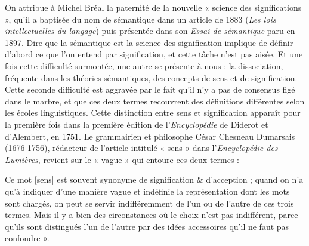 \begin{keybox}[Introduction]
\renewcommand{\thempfootnote}{校\arabic{editorialnote}}
On attribue à Michel Bréal la paternité de la nouvelle « science des significations », qu’il a baptisée du nom de sémantique dans un article de 1883 (\textit{Les lois intellectuelles du langage}) puis présentée dans son \textit{Essai de sémantique} paru en 1897. Dire que la sémantique est la science des signification implique de définir d’abord ce que l’on entend par signification, et cette tâche n’est pas aisée. Et une fois cette difficulté surmontée, une autre se présente à nous : la dissociation, fréquente dans les théories sémantiques, des concepts de sens et de signification. Cette seconde difficulté est aggravée par le fait qu’il n’y a pas de consensus figé dans le marbre, et que ces deux termes recouvrent des définitions différentes selon les écoles linguistiques. Cette distinction entre sens et signification apparaît pour la première fois dans la première édition de l’\textit{Encyclopédie} de Diderot et d’Alembert, en 1751. Le grammairien et philosophe César Chesneau Dumarsais (1676-1756), rédacteur de l’article intitulé « sens » dans l’\textit{Encyclopédie des Lumières}, revient sur le « vague » qui entoure ces deux termes :

Ce mot [sens] est souvent synonyme de signification \& d’acception ; quand on n’a qu’à indiquer d’une manière vague et indéfinie la représentation dont les mots sont chargés, on peut se servir indifféremment de l’un ou de l’autre de ces trois termes. Mais il y a bien des circonstances où le choix n’est pas indifférent, parce qu’ils sont distingués l’un de l’autre par des idées accessoires qu’il ne faut pas confondre ».


\end{keybox}
